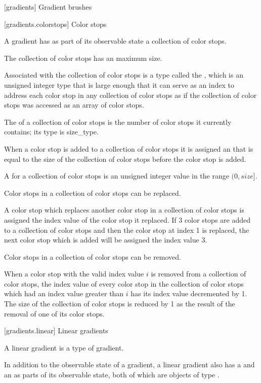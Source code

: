  [gradients] {Gradient brushes}

 [gradients.colorstops] {Color stops}

\pnum
A gradient has as part of its observable state a collection of color stops.

\pnum
The collection of color stops has an  maximum size.

\pnum
Associated with the collection of color stops is a type called the , which is an  unsigned integer type that is large enough that it can serve as an index to address each color stop in any collection of color stops as if the collection of color stops was accessed as an array of color stops.

\pnum
The  of a collection of color stops is the number of color stops it currently contains; its type is size_type.

\pnum
When a color stop is added to a collection of color stops it is assigned an  that is equal to the size of the collection of color stops before the color stop is added.

\pnum
A  for a collection of color stops is an unsigned integer value in the range $(0,size]$.

\pnum
Color stops in a collection of color stops can be replaced.

\pnum
A color stop which replaces another color stop in a collection of color stops is assigned the index value of the color stop it replaced.
\enterexample
If 3 color stops are added to a collection of color stops and then the color stop at index 1 is replaced, the next color stop which is added will be assigned the index value 3.
\exitexample

\pnum
Color stops in a collection of color stops can be removed.

\pnum
When a color stop with the valid index value $i$ is removed from a collection of color stops, the index value of every color stop in the collection of color stops which had an index value greater than $i$ has its index value decremented by 1.
\enternote
The size of the collection of color stops is reduced by 1 as the result of the removal of one of its color stops.
\exitnote

 [gradients.linear] {Linear gradients}

\pnum
A linear gradient is a type of gradient.

\pnum
In addition to the observable state of a gradient, a linear gradient also has a  and an  as parts of its observable state, both of which are objects of type .

